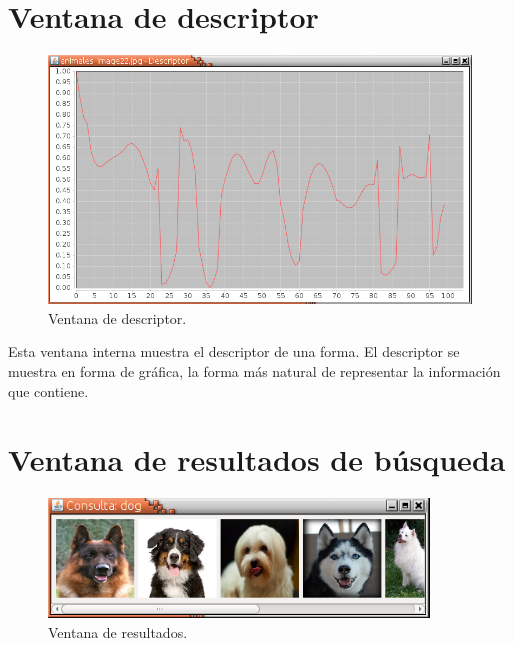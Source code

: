 \newpage
\section{Ventana de descriptor}
\begin{figure}[H]
\begin{center}

\includegraphics[width=1\textwidth]{img/v-descriptor.png}
\end{center}

\caption{Ventana de descriptor.}
\end{figure}


Esta ventana interna muestra el descriptor de una forma. El descriptor se muestra en forma de gráfica, la forma más natural de representar la información que contiene.

\newpage
\section{Ventana de resultados de búsqueda}
\begin{figure}[H]
\begin{center}

\includegraphics[width=0.9\textwidth]{img/v-resultado.png}
\end{center}

\caption{Ventana de resultados.}
\end{figure}

